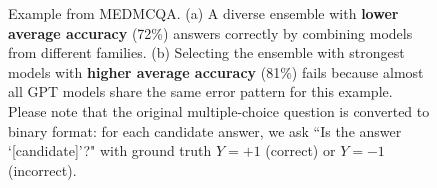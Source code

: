 \documentclass{article}
\theoremstyle{plain}
\theoremstyle{definition}
\theoremstyle{remark}
\begin{document}
\begin{figure}[t]
\begin{minipage}[t]{0.48\columnwidth}
\begin{tcolorbox}[
  colback=red!5,
  colframe=red!60!black,
  coltitle=white,
  title={\small\textbf{(b) Top-$k$ Accuracy}},
  fonttitle=\small,
  boxrule=0.8pt,
  arc=2pt,
  height=4.6cm,
  valign=top
]
\vspace{0.1cm}

\end{tcolorbox}
\end{minipage}


\caption{Example from MEDMCQA. (a) A diverse ensemble with \textbf{lower average accuracy} (72\%) answers correctly by combining models from different families. (b) Selecting the ensemble with strongest models with \textbf{higher average accuracy} (81\%) fails because almost all GPT models share the same error pattern for this example. Please note that the original multiple-choice question is converted to binary format: for each candidate answer, we ask ``Is the answer `[candidate]'?" with ground truth $Y=+1$ (correct) or $Y=-1$ (incorrect).}

\label{fig:diverse_vs_topk}
\vspace{-0.5cm}
\end{figure}
\end{document}
